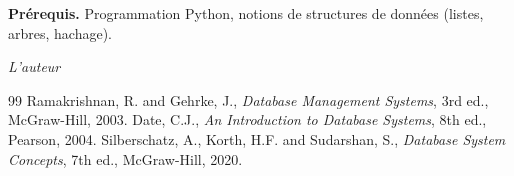 \documentclass[12pt,a4paper,twoside]{book}
\theoremstyle{definition}
\theoremstyle{plain}
\theoremstyle{remark}
\begin{document}
\medskip

\noindent\textbf{Pr\'erequis.} Programmation Python, notions de structures de donn\'ees (listes, arbres, hachage).

\vfill
\hfill\textit{L'auteur}


\mainmatter














\backmatter
\begin{thebibliography}{99}
 Ramakrishnan, R. and Gehrke, J., \emph{Database Management Systems}, 3rd ed., McGraw-Hill, 2003.
 Date, C.J., \emph{An Introduction to Database Systems}, 8th ed., Pearson, 2004.
 Silberschatz, A., Korth, H.F. and Sudarshan, S., \emph{Database System Concepts}, 7th ed., McGraw-Hill, 2020.
\end{thebibliography}
\printindex
\end{document}
